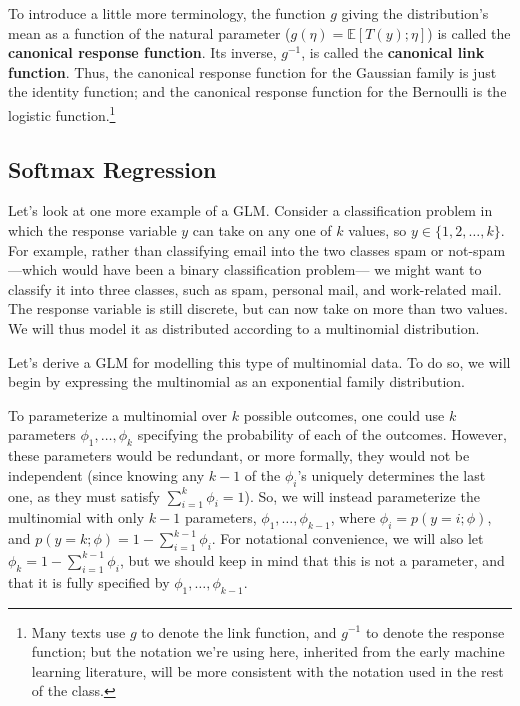 To introduce a little more terminology, the function $g$ giving the distribution's
mean as a function of the natural parameter ($g(\eta) = \mathbb E[T(y); \eta]$)
is called the \textbf{canonical response function}. Its inverse, $g^{-1}$, is called the
\textbf{canonical link function}. Thus, the canonical response function for the
Gaussian family is just the identity function; %
and the canonical response function for the Bernoulli is the logistic function.\footnote{Many texts use $g$ to denote the link function, and $g^{-1}$
to denote the response function; but the notation we're using here, inherited from the early machine learning literature,
will be more consistent with the notation used in the rest of the class.}

\subsection{Softmax Regression}
Let's look at one more example of a GLM. Consider a classification problem
in which the response variable $y$ can take on any one of $k$ values, so $y \in
\{1,2,\ldots,k\}$. For example, rather than classifying email into the two classes
spam or not-spam---which would have been a binary classification problem---
we might want to classify it into three classes, such as spam, personal mail,
and work-related mail. The response variable is still discrete, but can now
take on more than two values. We will thus model it as distributed according
to a multinomial distribution.

Let's derive a GLM for modelling this type of multinomial data. To do
so, we will begin by expressing the multinomial as an exponential family
distribution.

To parameterize a multinomial over $k$ possible outcomes, one could use
$k$ parameters $\phi_1 ,\ldots,\phi_k$ specifying the probability of each of the outcomes.
However, these parameters would be redundant, or more formally, they would
not be independent (since knowing any $k-1$ of the $\phi_i$'s uniquely determines
the last one, as they must satisfy $\sum_{i=1}^k \phi_i = 1$). So, we will instead parameterize
the multinomial with only $k - 1$ parameters, $\phi_1,\ldots,\phi_{k-1}$, where
$\phi_i = p(y = i;\phi)$, and $p(y = k;\phi) = 1 - \sum_{i=1}^{k-1} \phi_i$. For notational convenience,
we will also let $\phi_k = 1 - \sum_{i=1}^{k-1} \phi_i$, but we should keep in mind that this is
not a parameter, and that it is fully specified by $\phi_1,\ldots,\phi_{k-1}$.

